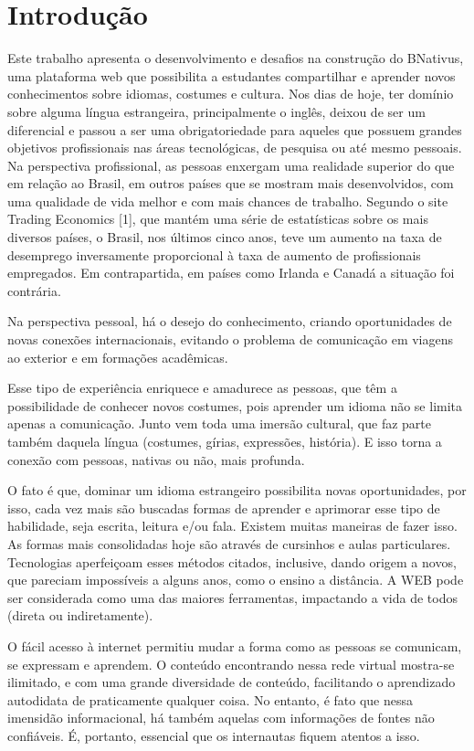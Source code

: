\chapter{Introdução}

Este trabalho apresenta o desenvolvimento e desafios na construção do BNativus,  uma plataforma web que possibilita a estudantes compartilhar e aprender novos conhecimentos sobre idiomas, costumes e cultura. 
Nos dias de hoje, ter domínio sobre alguma língua estrangeira, principalmente o inglês, deixou de ser um diferencial e passou a ser uma obrigatoriedade para aqueles que possuem grandes objetivos profissionais nas áreas tecnológicas, de pesquisa ou até mesmo pessoais. Na perspectiva profissional, as pessoas enxergam uma realidade superior do que em relação ao Brasil, em outros países que se mostram mais desenvolvidos, com uma qualidade de vida melhor e com mais chances de trabalho. Segundo o site Trading Economics [1], que mantém uma série de estatísticas sobre os mais diversos países, o Brasil, nos últimos cinco anos, teve um aumento na taxa de desemprego inversamente proporcional à taxa de aumento de profissionais empregados. Em contrapartida, em países como Irlanda e Canadá a situação foi contrária.

 Na perspectiva pessoal, há o desejo do conhecimento, criando oportunidades de novas conexões internacionais, evitando o problema de comunicação em viagens ao exterior e em formações acadêmicas.

Esse tipo de experiência enriquece e amadurece as pessoas, que têm a possibilidade de conhecer novos costumes, pois aprender um idioma não se limita apenas a comunicação. Junto vem toda uma imersão cultural, que faz parte também daquela língua (costumes, gírias, expressões, história). E isso torna a conexão com pessoas, nativas ou não, mais profunda.

O fato é que, dominar um idioma estrangeiro possibilita novas oportunidades, por isso, cada vez mais são buscadas formas de aprender e aprimorar esse tipo de habilidade, seja escrita, leitura e/ou fala. Existem muitas maneiras de fazer isso. As formas mais consolidadas hoje são através de cursinhos e aulas particulares. Tecnologias aperfeiçoam esses métodos citados, inclusive, dando origem a novos, que pareciam impossíveis a alguns anos, como o ensino a distância. A WEB pode ser considerada como uma das maiores ferramentas, impactando a vida de todos (direta ou indiretamente).

O fácil acesso à internet permitiu mudar a forma como as pessoas se comunicam, se expressam e aprendem. O conteúdo encontrando nessa rede virtual mostra-se ilimitado, e com uma grande diversidade de conteúdo, facilitando o aprendizado autodidata de praticamente qualquer coisa. No entanto, é fato que nessa imensidão informacional, há também aquelas com informações de fontes não confiáveis. É, portanto,  essencial que os internautas fiquem atentos a isso.

